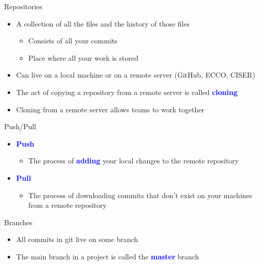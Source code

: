 \documentclass[11pt]{beamer}
\begin{document}
\begin{frame}{Repositories}\label{repo}
\begin{itemize}
	\item
	A collection of all the files and the history of those files
	\begin{itemize}
		\item Consists of all your commits
		\item Place where all your work is stored		
	\end{itemize}
	\item	
	Can live on a local machine or on a remote server (GitHub, ECCO, CISER)
	\item	
	The act of copying a repository from a remote server is called \textcolor{blue}{\textbf{cloning}}
	\item	
	Cloning from a remote server allows teams to work together
\end{itemize}
\end{frame}

\begin{frame}{Push/Pull}\label{push}
\begin{itemize}
	\item 
	\textcolor{blue}{\textbf{Push}}
	\begin{itemize}
		\item
		The process of \textcolor{blue}{\textbf{adding}} your local changes to the remote repository
	\end{itemize}
	\item 
	\textcolor{blue}{\textbf{Pull}}
	\begin{itemize}
		\item
		The process of downloading commits that don't exist on your machines from a remote repository
	\end{itemize}
\end{itemize}
\end{frame}

\begin{frame}{Branches}\label{branch}
\begin{itemize}
	\item
	All commits in git live on some branch
	\item
	The main branch in a project is called the \textcolor{blue}{\textbf{master}} branch
\end{itemize}
\end{frame}
\end{document}
